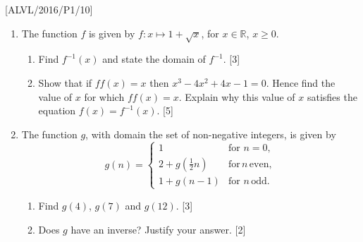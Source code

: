\item {[}ALVL/2016/P1/10{]}
\begin{enumerate}
\item The function $f$ is given by $f:x\mapsto1+\sqrt{x}$, for $x\in\mathbb{R}$,
$x\geq0$. 
\begin{enumerate}
\item Find $f^{-1}\left(x\right)$ and state the domain of $f^{-1}$. \hfill{}
{[}3{]}
\item Show that if $ff\left(x\right)=x$ then $x^{3}-4x^{2}+4x-1=0$. Hence
find the value of $x$ for which $ff\left(x\right)=x$. Explain why
this value of $x$ satisfies the equation $f\left(x\right)=f^{-1}\left(x\right)$.
\hfill{} {[}5{]}
\end{enumerate}
\item The function $g$, with domain the set of non-negative integers, is
given by 
\[
g\left(n\right)=\begin{cases}
1 & \text{for }n=0,\\
2+g\left(\frac{1}{2}n\right) & \text{for}\,n\,\text{even},\\
1+g\left(n-1\right) & \text{for }n\,\text{odd}.
\end{cases}
\]
 
\begin{enumerate}
\item Find $g\left(4\right)$, $g\left(7\right)$ and $g\left(12\right)$.
\hfill{}{[}3{]}
\item Does $g$ have an inverse? Justify your answer. \hfill{}{[}2{]}
\end{enumerate}
\end{enumerate}
